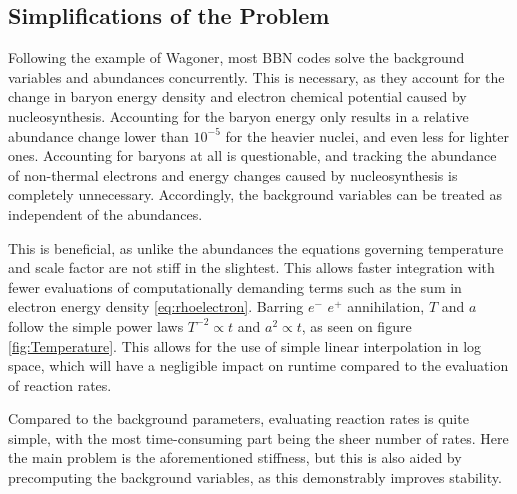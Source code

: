 \subsection{Simplifications of the Problem}
Following the example of Wagoner, most BBN codes solve the background variables and abundances concurrently. This is necessary, as they account for the change in baryon energy density and electron chemical potential caused by nucleosynthesis. Accounting for the baryon energy only results in a relative abundance change lower than $10^{-5}$ for the heavier nuclei, and even less for lighter ones. Accounting for baryons at all is questionable, and tracking the abundance of non-thermal electrons and energy changes caused by nucleosynthesis is completely unnecessary. Accordingly, the background variables can be treated as independent of the abundances.

This is beneficial, as unlike the abundances the equations governing temperature and scale factor are not stiff in the slightest. This allows faster integration with fewer evaluations of computationally demanding terms such as the sum in electron energy density \cref{eq:rhoelectron}. Barring $e^-$ $e^+$ annihilation, $T$ and $a$ follow the simple power laws $T^{-2}\propto t$ and $a^2\propto t$, as seen on figure \ref{fig:Temperature}. This allows for the use of simple linear interpolation in log space, which will have a negligible impact on runtime compared to the evaluation of reaction rates.

Compared to the background parameters, evaluating reaction rates is quite simple, with the most time-consuming part being the sheer number of rates. Here the main problem is the aforementioned stiffness, but this is also aided by precomputing the background variables, as this demonstrably improves stability.

\clearpage

